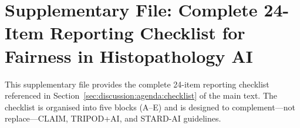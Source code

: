 
\section*{Supplementary File: Complete 24-Item Reporting Checklist for Fairness in Histopathology AI}
\label{app:checklist}

This supplementary file provides the complete 24-item reporting checklist referenced in Section~\ref{sec:discussion:agenda:checklist} of the main text. The checklist is organised into five blocks (A--E) and is designed to complement---not replace---CLAIM, TRIPOD+AI, and STARD-AI guidelines.

